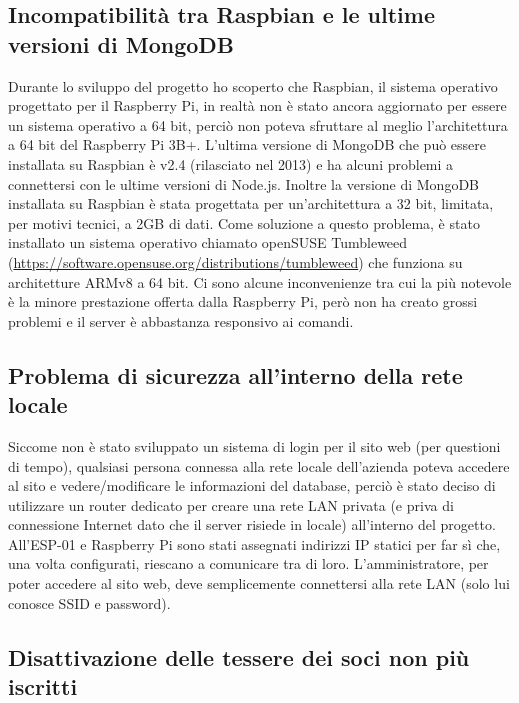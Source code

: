 \documentclass[12pt]{report}
\begin{document}
%
\subsection{Incompatibilità tra Raspbian e le ultime versioni di MongoDB}
%
Durante lo sviluppo del progetto ho scoperto che Raspbian, il sistema operativo progettato per il Raspberry Pi, in realtà non è stato ancora aggiornato per essere un sistema operativo a 64 bit, perciò non poteva sfruttare al meglio l'architettura a 64 bit del Raspberry Pi 3B+.
L'ultima versione di MongoDB che può essere installata su Raspbian è v2.4 (rilasciato nel 2013) e ha alcuni problemi a connettersi con le ultime versioni di Node.js. Inoltre la versione di MongoDB installata su Raspbian è stata progettata per un'architettura a 32 bit, limitata, per motivi tecnici, a 2GB di dati\cite{mongodb_32bit_limitations}.
Come soluzione a questo problema, è stato installato un sistema operativo chiamato openSUSE Tumbleweed (\url{https://software.opensuse.org/distributions/tumbleweed}) che funziona su architetture ARMv8 a 64 bit. Ci sono alcune inconvenienze tra cui la più notevole è la minore prestazione offerta dalla Raspberry Pi, però non ha creato grossi problemi e il server è abbastanza responsivo ai comandi. 

%
\subsection{Problema di sicurezza all'interno della rete locale}
%
Siccome non è stato sviluppato un sistema di login per il sito web (per questioni di tempo), qualsiasi persona connessa alla rete locale dell'azienda poteva accedere al sito e vedere/modificare le informazioni del database, perciò è stato deciso di utilizzare un router dedicato per creare una rete LAN privata (e priva di connessione Internet dato che il server risiede in locale) all'interno del progetto. All'ESP-01 e Raspberry Pi sono stati assegnati indirizzi IP statici per far sì che, una volta configurati, riescano a comunicare tra di loro. L'amministratore, per poter accedere al sito web, deve semplicemente connettersi alla rete LAN (solo lui conosce SSID e password).


%
\subsection{Disattivazione delle tessere dei soci non più iscritti}
%
\end{document}
